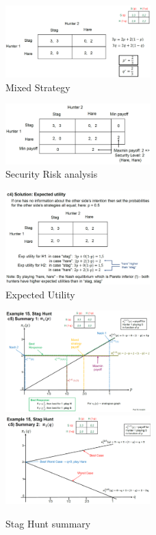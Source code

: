 \begin{figure}[H]
    \centering
    \includegraphics[width=0.5\textwidth]{Pictures/hunter_mixed_strategy.png}
    \caption{Mixed Strategy}
\end{figure}

\begin{figure}[H]
    \centering
    \includegraphics[width=0.5\textwidth]{Pictures/hunter_security_risk_analysis.png}
    \caption{Security Risk analysis}
\end{figure}

\begin{figure}[H]
    \centering
    \includegraphics[width=0.5\textwidth]{Pictures/hunter_expected_utility.png}
    \caption{Expected Utility}
\end{figure}

\begin{figure}[H]
    \centering
    \includegraphics[width=0.5\textwidth]{Pictures/stag_hunt_summary.png}
    \includegraphics[width=0.5\textwidth]{Pictures/stag_hunt_summary_2.png}
    \caption{Stag Hunt summary}
\end{figure}

